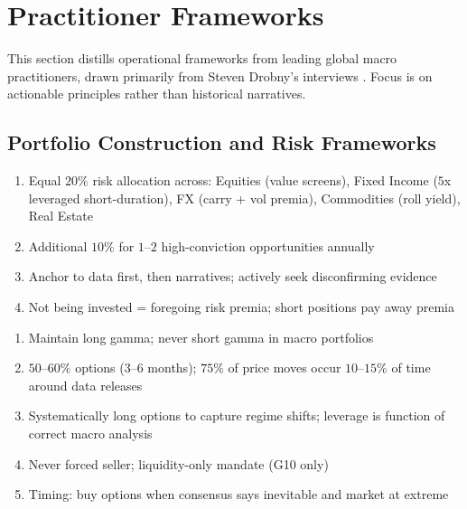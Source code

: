 \section{Practitioner Frameworks}

This section distills operational frameworks from leading global macro practitioners, drawn primarily from Steven Drobny's interviews \citep{s7-drobny}. Focus is on actionable principles rather than historical narratives.

\subsection{Portfolio Construction and Risk Frameworks}

\begin{remark} 
\begin{enumerate}[label=\roman*.]
\setlength{\itemsep}{0pt}
\item Equal $20\%$ risk allocation across: Equities (value screens), Fixed Income ($5$x leveraged short-duration), FX (carry + vol premia), Commodities (roll yield), Real Estate
\item Additional $10\%$ for $1$--$2$ high-conviction opportunities annually
\item Anchor to data first, then narratives; actively seek disconfirming evidence
\item Not being invested = foregoing risk premia; short positions pay away premia
\end{enumerate}
\end{remark}

\begin{remark} 
\begin{enumerate}[label=\roman*.]
\setlength{\itemsep}{0pt}
\item Maintain long gamma; never short gamma in macro portfolios
\item $50$--$60\%$ options ($3$--$6$ months); $75\%$ of price moves occur $10$--$15\%$ of time around data releases
\item Systematically long options to capture regime shifts; leverage is function of correct macro analysis
\item Never forced seller; liquidity-only mandate (G10 only)
\item Timing: buy options when consensus says inevitable and market at extreme
\end{enumerate}
\end{remark}

